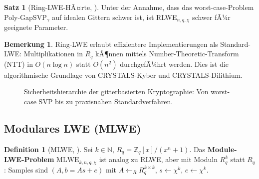 ﻿\documentclass[a4paper,12pt]{article}
\theoremstyle{definition}
\newtheorem{definition}{Definition}[section]
\newtheorem{bemerkung}{Bemerkung}[section]
\newtheorem{satz}{Satz}[section]
\begin{document}
\begin{satz}[Ring-LWE-HÃ¤rte, \cite{LPR10}]
Unter der Annahme, dass das worst-case-Problem Poly-GapSVP$_\gamma$ auf
idealen Gittern schwer ist, ist RLWE$_{n,q,\chi}$ schwer fÃ¼r geeignete Parameter.
\end{satz}

\begin{bemerkung}
Ring-LWE erlaubt effizientere Implementierungen als Standard-LWE: Multiplikationen
in $R_q$ kÃ¶nnen mittels Number-Theoretic-Transform (NTT) in $O(n \log n)$
statt $O(n^2)$ durchgefÃ¼hrt werden. Dies ist die algorithmische Grundlage
von CRYSTALS-Kyber und CRYSTALS-Dilithium.
\end{bemerkung}

\begin{figure}[H]
\centering
{}
\caption{Sicherheitshierarchie der gitterbasierten Kryptographie: Von worst-case SVP bis zu praxisnahen Standardverfahren.}
\label{fig:haertebaum}
\end{figure}

\subsection{Modulares LWE (MLWE)}

\begin{definition}[MLWE, \cite{LS15}]
Sei $k \in \mathbb{N}$, $R_q = \mathbb{Z}_q[x]/(x^n+1)$.
Das \textbf{Module-LWE-Problem} $\mathrm{MLWE}_{k,n,q,\chi}$ ist analog zu RLWE,
aber mit Moduln $R_q^k$ statt $R_q$: Samples sind $(A, b = As + e)$ mit
$A \leftarrow_R R_q^{k \times k}$, $s \leftarrow \chi^k$, $e \leftarrow \chi^k$.
\end{definition}
\end{document}
